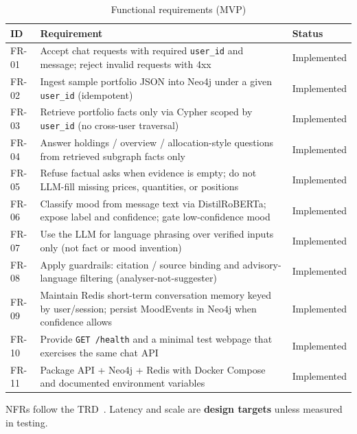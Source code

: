 \begin{table}[!htbp]
\centering
\small
\caption{Functional requirements (MVP)}
\label{tab:frs}
\begin{tabularx}{\textwidth}{@{}
  >{\centering\arraybackslash}p{}
  >{\raggedright\arraybackslash}X
  >{\centering\arraybackslash}p{}
  @{}}
\toprule
\textbf{ID} & \textbf{Requirement} & \textbf{Status} \\
\midrule
FR-01 &
Accept chat requests with required \texttt{user\_id} and message; reject invalid requests with 4xx &
Implemented \\
\addlinespace
FR-02 &
Ingest sample portfolio JSON into Neo4j under a given \texttt{user\_id} (idempotent) &
Implemented \\
\addlinespace
FR-03 &
Retrieve portfolio facts only via Cypher scoped by \texttt{user\_id} (no cross-user traversal) &
Implemented \\
\addlinespace
FR-04 &
Answer holdings / overview / allocation-style questions from retrieved subgraph facts only &
Implemented \\
\addlinespace
FR-05 &
Refuse factual asks when evidence is empty; do not LLM-fill missing prices, quantities, or positions &
Implemented \\
\addlinespace
FR-06 &
Classify mood from message text via DistilRoBERTa; expose label and confidence; gate low-confidence mood &
Implemented \\
\addlinespace
FR-07 &
Use the LLM for language phrasing over verified inputs only (not fact or mood invention) &
Implemented \\
\addlinespace
FR-08 &
Apply guardrails: citation / source binding and advisory-language filtering (analyser-not-suggester) &
Implemented \\
\addlinespace
FR-09 &
Maintain Redis short-term conversation memory keyed by user/session; persist MoodEvents in Neo4j when confidence allows &
Implemented \\
\addlinespace
FR-10 &
Provide \texttt{GET /health} and a minimal test webpage that exercises the same chat API &
Implemented \\
\addlinespace
FR-11 &
Package API + Neo4j + Redis with Docker Compose and documented environment variables &
Implemented \\
\bottomrule
\end{tabularx}
\end{table}

NFRs follow the TRD~\cite{trd}. Latency and scale are \textbf{design targets} unless measured in testing.


